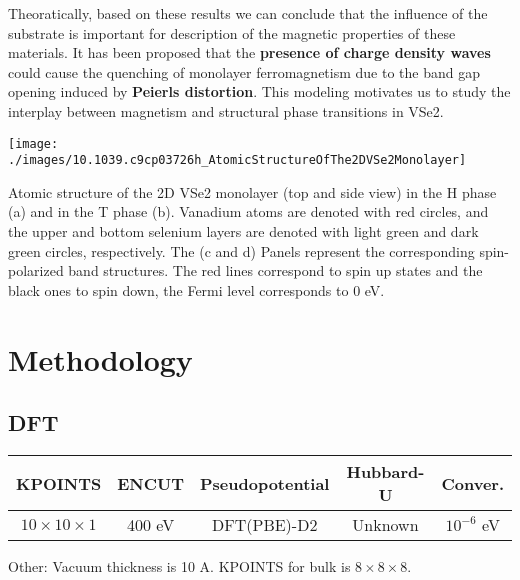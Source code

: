 Theoratically, based on these results we can conclude that the influence of the substrate is important for description of the magnetic properties of these materials. It has been proposed that the \textbf{presence of charge density waves} could cause the quenching of monolayer ferromagnetism due to the band gap opening induced by \textbf{Peierls distortion}. This modeling motivates us to study the interplay between magnetism and structural phase transitions in VSe2.

\begin{marginfigure}
    \texttt{[image: ./images/10.1039.c9cp03726h\_AtomicStructureOfThe2DVSe2Monolayer]}
	\caption[Atomic structure of the 2D VSe2 monolayer in the H phase and in the T phase.]{
        Atomic structure of the 2D VSe2 monolayer (top and side view) in the H phase (a) and in the T phase (b). Vanadium atoms are denoted with red circles, and the upper and bottom selenium layers are denoted with light green and dark green circles, respectively. The (c and d) Panels represent the corresponding spin-polarized band structures. The red lines correspond to spin up states and the black ones to spin down, the Fermi level corresponds to 0 eV.
	}
\end{marginfigure}
\section{Methodology}


\subsection{DFT}
\begin{table}[h]
    \begin{tabular}{ccccc}
    \toprule
    KPOINTS                 & ENCUT  & Pseudopotential & Hubbard-U & Conver.      \\
    \midrule
    $10 \times 10 \times 1$ & 400 eV & DFT(PBE)-D2     & Unknown   & $10^{-6}$ eV \\
    \bottomrule
    \end{tabular}
\end{table}
Other: Vacuum thickness is 10 A. KPOINTS for bulk is $8 \times 8 \times 8$.
